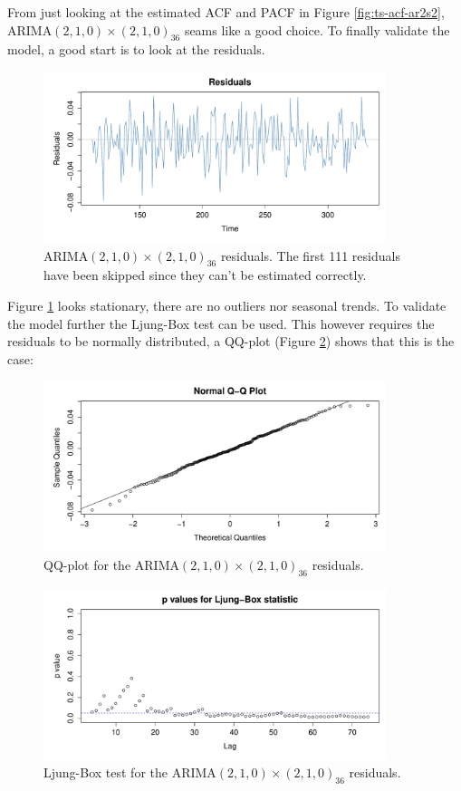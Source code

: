From just looking at the estimated ACF and PACF in Figure \ref{fig:ts-acf-ar2s2}, ARIMA$(2,1,0) \times (2,1,0)_{36}$ seams like a good choice. To finally validate the model, a good start is to look at the residuals.
\begin{figure}[H]
	\centering
	\includegraphics[height=5cm]{figures/ts-final-residual}
	\caption{ARIMA$(2,1,0) \times (2,1,0)_{36}$ residuals. The first 111 residuals have been skipped since they can't be estimated correctly.}
	\label{fig:ts-final-residual}
\end{figure}

Figure \ref{fig:ts-final-residual} looks stationary, there are no outliers nor seasonal trends. To validate the model further the Ljung-Box test can be used. This however requires the residuals to be normally distributed, a QQ-plot (Figure \ref{fig:ts-final-qq}) shows that this is the case:
\begin{figure}[H]
	\centering
	\includegraphics[height=5cm]{figures/ts-final-qq}
	\caption{QQ-plot for the ARIMA$(2,1,0) \times (2,1,0)_{36}$ residuals.}
	\label{fig:ts-final-qq}
\end{figure}

\begin{figure}[H]
	\centering
	\includegraphics[height=5cm]{figures/ts-final-ljungbox}
	\caption{Ljung-Box test for the ARIMA$(2,1,0) \times (2,1,0)_{36}$ residuals.}
	\label{fig:ts-final-ljungbox}
\end{figure}

